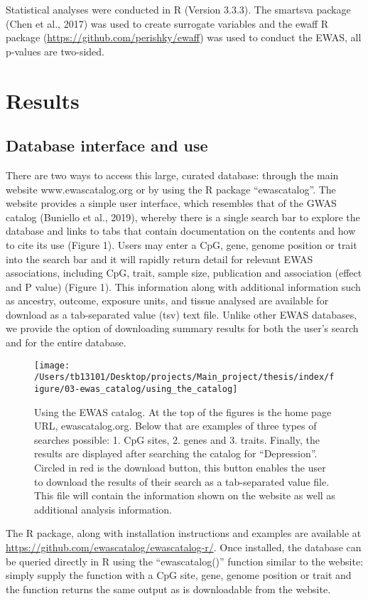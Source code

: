 \documentclass[11pt,twoside]{bristolthesis}
\begin{document}
Statistical analyses were conducted in R (Version 3.3.3). The smartsva package (Chen et al., 2017) was used to create surrogate variables and the ewaff R package (\url{https://github.com/perishky/ewaff}) was used to conduct the EWAS, all p-values are two-sided.

\hypertarget{results}{%
\section{Results}\label{results}}

\hypertarget{database-interface-and-use}{%
\subsection{Database interface and use}\label{database-interface-and-use}}

There are two ways to access this large, curated database: through the main website www.ewascatalog.org or by using the R package ``ewascatalog''. The website provides a simple user interface, which resembles that of the GWAS catalog (Buniello et al., 2019), whereby there is a single search bar to explore the database and links to tabs that contain documentation on the contents and how to cite its use (Figure 1). Users may enter a CpG, gene, genome position or trait into the search bar and it will rapidly return detail for relevant EWAS associations, including CpG, trait, sample size, publication and association (effect and P value) (Figure 1). This information along with additional information such as ancestry, outcome, exposure units, and tissue analysed are available for download as a tab-separated value (tsv) text file. Unlike other EWAS databases, we provide the option of downloading summary results for both the user's search and for the entire database.
\begin{figure}

{\centering \texttt{[image: /Users/tb13101/Desktop/projects/Main\_project/thesis/index/figure/03-ewas\_catalog/using\_the\_catalog]} 

}

\caption{Using the EWAS catalog. 
At the top of the figures is the home page URL, ewascatalog.org. 
Below that are examples of three types of searches possible: 
1. CpG sites, 2. genes and 3. traits. 
Finally, the results are displayed after searching the catalog for “Depression”. 
Circled in red is the download button, this button enables the user to download the results of their search as a tab-separated value file. 
This file will contain the information shown on the website as well as additional analysis information.}\label{fig:catalog-use}
\end{figure}
The R package, along with installation instructions and examples are available at \url{https://github.com/ewascatalog/ewascatalog-r/}. Once installed, the database can be queried directly in R using the ``ewascatalog()'' function similar to the website: simply supply the function with a CpG site, gene, genome position or trait and the function returns the same output as is downloadable from the website.
\end{document}

